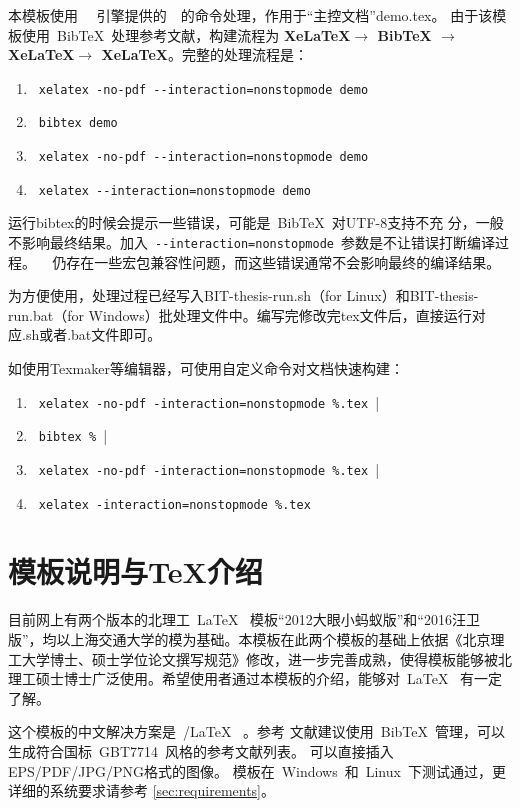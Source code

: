 本模板使用~\XeTeX~ 引擎提供的~\XeLaTeX~的命令处理，作用于“主控文档”demo.tex。
由于该模板使用~{{\sc Bib}\TeX}~处理参考文献，构建流程为 \textbf{XeLaTeX$\rightarrow$ BibTeX $\rightarrow$ XeLaTeX$\rightarrow$ XeLaTeX}。完整的处理流程是：

{\color{blue}
\begin{enumerate}
\item[] ~\verb|xelatex -no-pdf --interaction=nonstopmode demo|
\item[] ~\verb|bibtex demo| 
\item[] ~\verb|xelatex -no-pdf --interaction=nonstopmode demo|
\item[] ~\verb|xelatex --interaction=nonstopmode demo|
\end{enumerate}}

运行bibtex的时候会提示一些错误，可能是~{{\sc Bib}\TeX}~对UTF-8支持不充
分，一般不影响最终结果。加入~\verb|--interaction=nonstopmode|~参数是不让错误打断编译过程。
\XeTeX~ 仍存在一些宏包兼容性问题，而这些错误通常不会影响最终的编译结果。

为方便使用，处理过程已经写入BIT-thesis-run.sh（for Linux）和BIT-thesis-run.bat（for Windows）批处理文件中。编写完修改完tex文件后，直接运行对应.sh或者.bat文件即可。

如使用Texmaker等编辑器，可使用自定义命令对文档快速构建：

{\color{blue}
\begin{enumerate}
\item[] ~\verb|xelatex -no-pdf -interaction=nonstopmode %.tex ||
\item[] ~\verb|bibtex % || 
\item[] ~\verb|xelatex -no-pdf -interaction=nonstopmode %.tex ||
\item[] ~\verb|xelatex -interaction=nonstopmode %.tex|
\end{enumerate}}


\section{模板说明与TeX介绍}
\label{sec:features}
 
目前网上有两个版本的北理工~\LaTeX~ 模板“2012大眼小蚂蚁版”和“2016汪卫版”，均以上海交通大学的模为基础。本模板在此两个模板的基础上依据《北京理工大学博士、硕士学位论文撰写规范》修改，进一步完善成熟，使得模板能够被北理工硕士博士广泛使用。希望使用者通过本模板的介绍，能够对~\LaTeX~ 有一定了解。

这个模板的中文解决方案是~\XeTeX/\LaTeX~ 。参考
文献建议使用~BibTeX~管理，可以生成符合国标~GBT7714~风格的参考文献列表。
可以直接插入EPS/PDF/JPG/PNG格式的图像。
模板在~Windows~和~Linux~下测试通过，更详细的系统要求请参考
\ref{sec:requirements}。

